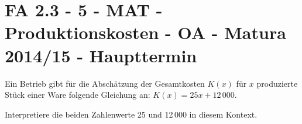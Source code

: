 \section{FA 2.3 - 5 - MAT - Produktionskosten - OA - Matura 2014/15 - Haupttermin}

\begin{beispiel}[FA 2.3]{1} %
Ein Betrieb gibt für die Abschätzung der Gesamtkosten $K(x)$ für $x$ produzierte Stück einer Ware folgende Gleichung an: $K(x) = 25x + 12\,000$. \leer

Interpretiere die beiden Zahlenwerte 25 und 12\,000 in diesem Kontext.


\end{beispiel}